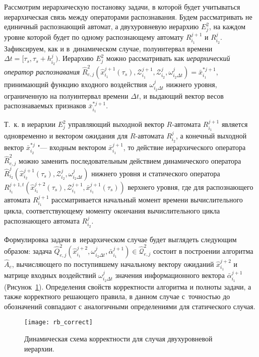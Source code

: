 Рассмотрим иерархическую постановку задачи, в которой будет учитываться иерархическая связь между операторами распознавания. Будем рассматривать не единичный распознающий автомат, а двухуровневую иерархию $E_j^2$, на каждом уровне которой будет по одному распознающему автомату $R_{i_1}^{j+1}$ и $R_{i_2}^j$. Зафиксируем, как и в~динамическом случае, полуинтервал времени $\Delta t=[\tau_s,\tau_s+h_{i_2}^j)$. Иерархию $E_j^2$ можно рассматривать как \textit{иерархический оператор распознавания} $\hat R_{e,j}^2(\hat x_{i_1}^{j+1}(\tau_s),\mathcal Z_{i_1}^{j+1},\mathcal Z_{i_2}^j,\omega_{i_2\Delta t}^j)=\bar x_{i_1}^{*j+1}$, принимающий функцию входного воздействия $\omega_{i_2\Delta t}^j$ нижнего уровня, ограниченную на полуинтервал времени $\Delta t$, и выдающий вектор весов распознаваемых признаков $\bar x_{i_1}^{*j+1}$. 

Т.~к. в иерархии $E_j^2$ управляющий выходной вектор $R$-автомата $R_{i_1}^{j+1}$ является одновременно и вектором ожидания для $R$-автомата $R_{i_2}^j$, а конечный выходной вектор $\bar x_{i_2}^{*j}$ "--- входным вектором $\bar x_{i_1}^{j+1}$, то действие иерархического оператора $\hat R_{e,j}^2$ можно заменить последовательным действием динамического оператора $\hat R_{i_2}^j(\hat x _{i_2}^{j+1}(\tau_s),\mathcal Z_{i_2}^j,\omega_{i_2\Delta t}^j)$ нижнего уровня и статического оператора $R_{i_1}^{j+1,t}(\hat x _{i_1}^{j+2}(\tau_s),\mathcal Z_{i_1}^{j+1},\bar x_{i_1}^{j+1}(\tau_s))$ верхнего уровня, где для распознающего автомата $R_{i_1}^{j+1}$ рассматривается начальный момент времени вычислительного цикла, соответствующему моменту окончания вычислительного цикла распознающего автомата $R_{i_2}^j$.

Формулировка задачи в~иерархическом случае будет выглядеть следующим образом: задача $\hat Q_{e,j}^2(\hat x_{i_1}^{j+2},\omega_{i_2\Delta t}^j,\bar\alpha_{i_1}^{j+1})\in\hat{\mathcal Q}_{e,j}^2$ состоит в построении алгоритма $\hat A_e$, вычисляющего по поступившему начальному вектору ожиданий $\hat x_{i_1}^{j+2}$ и матрице входных воздействий $\omega_{i_2\Delta t}^j$ значения информационного вектора $\bar\alpha_{i_1}^{j+1}$ (Рисунок~\ref{fig:rb_correct_hier}). Определения свойств корректности алгоритма и полноты задачи, а также корректного решающего правила, в данном случае с~точностью до обозначений совпадают с аналогичными определениями для статического случая.

\begin{figure}[h]
	\centering
	\texttt{[image: rb\_correct]}
	\caption{Динамическая схема корректности для случая двухуровневой иерархии.}
	\label{fig:rb_correct_hier}
\end{figure}

